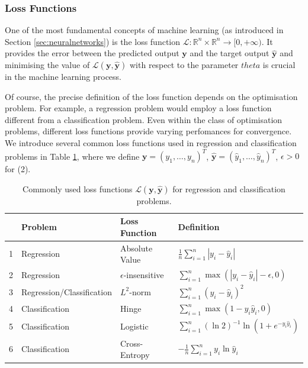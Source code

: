 \documentclass[a4paper,11pt,titlepage]{article}
\def\theta{theta}%
\theoremstyle{definition}
\theoremstyle{plain}
\theoremstyle{remark}
\begin{document}
\subsubsection{Loss Functions}

One of the most fundamental concepts of machine learning (as introduced in Section \ref{sec:neuralnetworks}) is the loss function $\mathcal{L}: \mathbb{R}^n \times \mathbb{R}^n \to [0, +\infty )$. It provides the error between the predicted output $\mathbf{y}$ and the target output $\mathbf{\hat{y}}$ and minimising the value of $\mathcal{L}(\mathbf{y}, \mathbf{\hat{y}})$ with respect to the parameter $\theta$ is crucial in the machine learning process. 

Of course, the precise definition of the loss function depends on the optimisation problem. For example, a regression problem would employ a loss function different from a classification problem. Even within the class of optimisation problems, different loss functions provide varying perfomances for convergence. We introduce several common loss functions used in regression and classification problems in Table \ref{tab:lfd}, where we define $\mathbf{y} = \left(y_1, \dots, y_n\right)^T$, $\mathbf{\hat{y}} = \left(\hat{y}_1, \dots, \hat{y}_n\right)^T$, $\epsilon > 0$ for (2).
\begin{table}[htbp]
    \centering
    \begin{tabular}{llll}
        \toprule
          & Problem  & Loss Function  &  Definition \\
        \midrule
        1 & Regression       & Absolute Value            & $\frac{1}{n}\sum_{i=1}^n |y_i - \hat{y}_i|$      \\
        2 &Regression       & $\epsilon$-insensitive   & $\sum_{i=1}^n \max{(|y_i - \hat{y}_i| - \epsilon, 0)}$\\
        3 & Regression/Classification       & $L^2$-norm                   & $\sum_{i=1}^n\left(y_i - \hat{y}_i\right)^2$        \\
        4 & Classification  & Hinge                     & $\sum_{i=1}^n\max{(1-y_i\hat{y}_i, 0)}$ \\
        5 & Classification  & Logistic                  & $\sum_{i=1}^n \left(\ln 2\right)^{-1}\ln(1 + e^{-y_i\hat{y}_i})$ \\
        6 & Classification  & Cross-Entropy             & $- \frac{1}{n} \sum_{i=1}^n y_i\ln \hat{y}_i$\\ 
        \bottomrule
    \end{tabular}
    \caption{Commonly used loss functions $\mathcal{L}(\mathbf{y}, \mathbf{\hat{y}})$ for regression and classification problems.}
    \label{tab:lfd}
\end{table}
\end{document}

